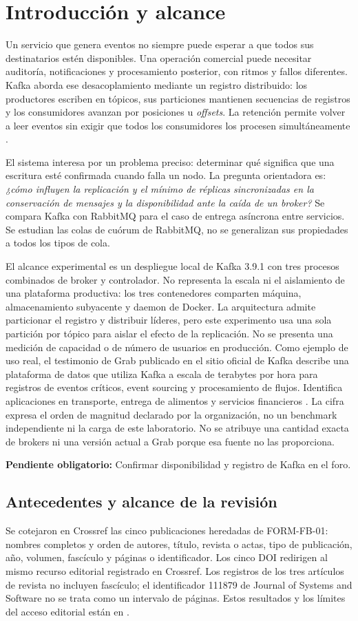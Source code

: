 \documentclass[11pt,a4paper]{article}
\newcommand{\pendiente}[1]{\par\textbf{Pendiente obligatorio:} #1\par}
\begin{document}
\section{Introducción y alcance}
Un servicio que genera eventos no siempre puede esperar a que todos sus destinatarios estén disponibles. Una operación comercial puede necesitar auditoría, notificaciones y procesamiento posterior, con ritmos y fallos diferentes. Kafka aborda ese desacoplamiento mediante un registro distribuido: los productores escriben en tópicos, sus particiones mantienen secuencias de registros y los consumidores avanzan por posiciones u \textit{offsets}. La retención permite volver a leer eventos sin exigir que todos los consumidores los procesen simultáneamente \cite{kafka391design}.

El sistema interesa por un problema preciso: determinar qué significa que una escritura esté confirmada cuando falla un nodo. La pregunta orientadora es: \emph{¿cómo influyen la replicación y el mínimo de réplicas sincronizadas en la conservación de mensajes y la disponibilidad ante la caída de un broker?} Se compara Kafka con RabbitMQ para el caso de entrega asíncrona entre servicios. Se estudian las colas de cuórum de RabbitMQ, no se generalizan sus propiedades a todos los tipos de cola.

El alcance experimental es un despliegue local de Kafka 3.9.1 con tres procesos combinados de broker y controlador. No representa la escala ni el aislamiento de una plataforma productiva: los tres contenedores comparten máquina, almacenamiento subyacente y daemon de Docker. La arquitectura admite particionar el registro y distribuir líderes, pero este experimento usa una sola partición por tópico para aislar el efecto de la replicación. No se presenta una medición de capacidad o de número de usuarios en producción.
Como ejemplo de uso real, el testimonio de Grab publicado en el sitio oficial de Kafka describe una plataforma de datos que utiliza Kafka a escala de terabytes por hora para registros de eventos críticos, event sourcing y procesamiento de flujos. Identifica aplicaciones en transporte, entrega de alimentos y servicios financieros \cite{kafkapoweredby}. La cifra expresa el orden de magnitud declarado por la organización, no un benchmark independiente ni la carga de este laboratorio. No se atribuye una cantidad exacta de brokers ni una versión actual a Grab porque esa fuente no las proporciona.
\pendiente{Confirmar disponibilidad y registro de Kafka en el foro.}

\subsection{Antecedentes y alcance de la revisión}
Se cotejaron en Crossref las cinco publicaciones heredadas de FORM-FB-01: nombres completos y orden de autores, título, revista o actas, tipo de publicación, año, volumen, fascículo y páginas o identificador. Los cinco DOI redirigen al mismo recurso editorial registrado en Crossref. Los registros de los tres artículos de revista no incluyen fascículo; el identificador 111879 de Journal of Systems and Software no se trata como un intervalo de páginas. Estos resultados y los límites del acceso editorial están en .
\end{document}
